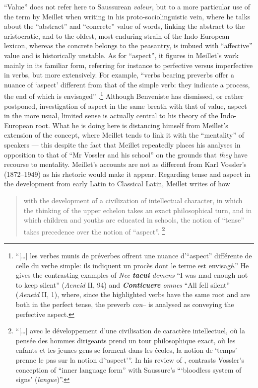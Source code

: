 \documentclass[output=paper]{langscibook}
\begin{document}
``Value'' does not refer here to Saussurean \emph{valeur}, but to a more particular use of the term by Meillet when writing in his proto-sociolinguistic vein, where he talks about the ``abstract'' and ``concrete'' value of words, linking the abstract to the aristocratic, and to the oldest, most enduring strain of the Indo-European lexicon, whereas the concrete belongs to the peasantry, is imbued with ``affective'' value and is historically unstable. As for ``aspect'', it figures in Meillet's work mainly in its familiar form, referring for instance to perfective versus imperfective in verbs, but more extensively. For example, ``verbs bearing preverbs offer a nuance of `aspect' different from that of the simple verb: they indicate a process, the end of which is envisaged'' \citep[263--264]{Meillet1931}.\footnote{``[…] les verbes munis de préverbes offrent une nuance d’“aspect” différente de celle du verbe simple: ils indiquent un procès dont le terme est envisagé.'' He gives the contrasting examples of \emph{Nec \textbf{tacui} demens} ``I was mad enough not to keep silent'' (\emph{Aeneid} II, 94) and \emph{\textbf{Conticuere} omnes} ``All fell silent'' (\emph{Aeneid} II, 1), where, since the highlighted verbs have the same root and are both in the perfect tense, the preverb \emph{con}-- is analysed as conveying the perfective aspect.} Although Benveniste has dismissed, or rather postponed, investigation of aspect in the same breath with that of value, aspect in the more usual, limited sense is actually central to his theory of the Indo-European root. What he is doing here is distancing himself from Meillet's extension of the concept, where Meillet tends to link it with the ``mentality'' of speakers — this despite the fact that Meillet repeatedly places his analyses in opposition to that of ``Mr Vossler and his school'' on the grounds that \emph{they} have recourse to mentality. Meillet's accounts are not as different from Karl Vossler's (1872--1949) as his rhetoric would make it appear. Regarding tense and aspect in the development from early Latin to Classical Latin, Meillet writes of how

\begin{quotation}
with the development of a civilization of intellectual character, in which the thinking of the upper echelon takes an exact philosophical turn, and in which children and youths are educated in schools, the notion of ``tense'' takes precedence over the notion of ``aspect''. \citep[270--271]{Meillet1931}\footnote{``[…] avec le développement d'une civilisation de caractère intellectuel, où la pensée des hommes dirigeants prend un tour philosophique exact, où les enfants et les jeunes gens se forment dans les écoles, la notion de `temps' prenne le pas sur la notion d'`aspect'\thinspace''. In his review of \citet{Vossler1932}, \citet[234]{Firth1933} contrasts Vossler's conception of ``inner language form'' with Saussure's ```bloodless system of signs' (\emph{langue})''.}
\end{quotation}
\end{document}

